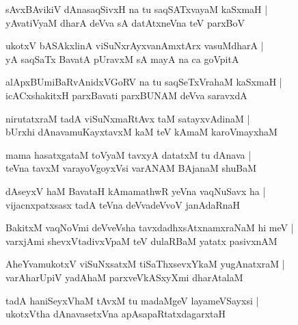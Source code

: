 \begin{shloka}
sAvxBAvikiV dAnasaqSivxH na tu saqSATxvayaM kaSxmaH |\\ yAvatiVyaM dharA deVva sA datAtxneVna teV parxBoV
\end{shloka}

\begin{shloka}
ukotxV bASAkxlinA viSuNxrAyxvanAmxtArx vasuMdharA |\\ yA saqSaTx BavatA pUravxM sA mayA na ca goVpitA
\end{shloka}

\begin{shloka}
alApxBUmiBaRvAnidxVGoRV na tu saqSeTxVrahaM kaSxmaH |\\ icACxshakitxH parxBavati parxBUNAM deVva saravxdA
\end{shloka}

\begin{shloka}
nirutatxraM tadA viSuNxmaRtAvx taM satayxvAdinaM |\\
bUrxhi dAnavamuKayxtavxM kaM teV kAmaM karoVmayxhaM 
\end{shloka}

\begin{shloka}
mama hasatxgataM toVyaM tavxyA datatxM tu dAnava |\\ teVna tavxM varayoVgoyxVsi varANAM BAjanaM shuBaM
\end{shloka}

\begin{shloka}
dAseyxV haM BavataH kAmamathwR yeVna vaqNuSavx ha |\\ vijacnxpatxsasx tadA teVna deVvadeVvoV janAdaRnaH
\end{shloka}

\begin{shloka}
BakitxM vaqNoVmi deVveVsha tavxdadhxsAtxnamxraNaM hi meV |\\ varxjAmi shevxVtadivxVpaM teV dulaRBaM yatatx pasivxnAM
\end{shloka}

\begin{shloka}
AheYvamukotxV viSuNxsatxM tiSaThxsevxYkaM yugAnatxraM |\\ varAharUpiV yadAhaM parxveVkASxyXmi dharAtalaM
\end{shloka}

\begin{shloka}
tadA haniSeyxVhaM tAvxM tu madaMgeV layameVSayxsi |\\
ukotxVtha dAnavasetxVna apAsapaRtatxdagarxtaH
\end{shloka}

